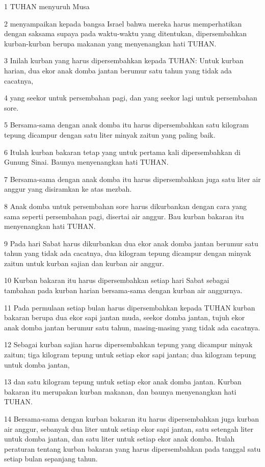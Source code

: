 \par 1 TUHAN menyuruh Musa
\par 2 menyampaikan kepada bangsa Israel bahwa mereka harus memperhatikan dengan saksama supaya pada waktu-waktu yang ditentukan, dipersembahkan kurban-kurban berupa makanan yang menyenangkan hati TUHAN.
\par 3 Inilah kurban yang harus dipersembahkan kepada TUHAN: Untuk kurban harian, dua ekor anak domba jantan berumur satu tahun yang tidak ada cacatnya,
\par 4 yang seekor untuk persembahan pagi, dan yang seekor lagi untuk persembahan sore.
\par 5 Bersama-sama dengan anak domba itu harus dipersembahkan satu kilogram tepung dicampur dengan satu liter minyak zaitun yang paling baik.
\par 6 Itulah kurban bakaran tetap yang untuk pertama kali dipersembahkan di Gunung Sinai. Baunya menyenangkan hati TUHAN.
\par 7 Bersama-sama dengan anak domba itu harus dipersembahkan juga satu liter air anggur yang disiramkan ke atas mezbah.
\par 8 Anak domba untuk persembahan sore harus dikurbankan dengan cara yang sama seperti persembahan pagi, disertai air anggur. Bau kurban bakaran itu menyenangkan hati TUHAN.
\par 9 Pada hari Sabat harus dikurbankan dua ekor anak domba jantan berumur satu tahun yang tidak ada cacatnya, dua kilogram tepung dicampur dengan minyak zaitun untuk kurban sajian dan kurban air anggur.
\par 10 Kurban bakaran itu harus dipersembahkan setiap hari Sabat sebagai tambahan pada kurban harian bersama-sama dengan kurban air anggurnya.
\par 11 Pada permulaan setiap bulan harus dipersembahkan kepada TUHAN kurban bakaran berupa dua ekor sapi jantan muda, seekor domba jantan, tujuh ekor anak domba jantan berumur satu tahun, masing-masing yang tidak ada cacatnya.
\par 12 Sebagai kurban sajian harus dipersembahkan tepung yang dicampur minyak zaitun; tiga kilogram tepung untuk setiap ekor sapi jantan; dua kilogram tepung untuk domba jantan,
\par 13 dan satu kilogram tepung untuk setiap ekor anak domba jantan. Kurban bakaran itu merupakan kurban makanan, dan baunya menyenangkan hati TUHAN.
\par 14 Bersama-sama dengan kurban bakaran itu harus dipersembahkan juga kurban air anggur, sebanyak dua liter untuk setiap ekor sapi jantan, satu setengah liter untuk domba jantan, dan satu liter untuk setiap ekor anak domba. Itulah peraturan tentang kurban bakaran yang harus dipersembahkan pada tanggal satu setiap bulan sepanjang tahun.
